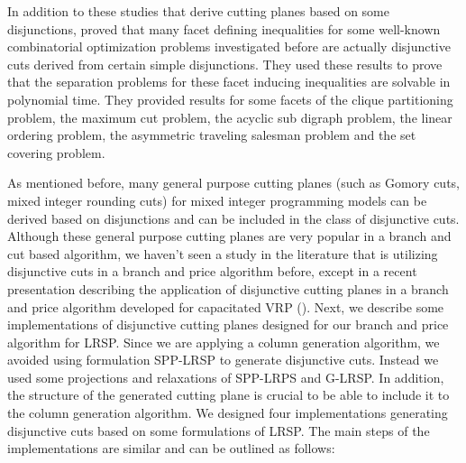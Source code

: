 In addition to these studies that derive cutting planes based on some disjunctions,
\citet{Letchford01} proved that  many facet defining inequalities for some well-known
combinatorial optimization problems investigated before are actually disjunctive cuts
derived from certain simple disjunctions.
They used these results to prove that the separation
problems for these facet inducing inequalities are solvable in polynomial time. They provided
results for some facets of the clique partitioning problem, the maximum cut problem,
the acyclic sub digraph problem, the linear ordering problem, the asymmetric traveling
salesman problem and the set covering problem.

As mentioned before, many general purpose cutting planes (such as Gomory cuts, mixed
integer rounding cuts) for mixed integer programming models can be  derived based on
disjunctions and can be included in the class of disjunctive cuts. Although
these general purpose cutting planes are very popular in a branch and cut based
algorithm, we haven't seen a study in the literature that is utilizing disjunctive cuts
in a branch and price algorithm before, except in a recent
presentation describing the application of disjunctive cutting planes in a branch and price
algorithm developed for capacitated VRP (\citet{Ropke08}). Next, we describe some
implementations of disjunctive cutting planes designed for our branch and price algorithm
for LRSP. Since we are applying a column generation algorithm, we avoided
using formulation SPP-LRSP to generate disjunctive cuts. Instead we used some projections
and relaxations of SPP-LRPS and G-LRSP. In addition,  the structure of the generated
cutting plane is crucial to be able to include it to the column generation algorithm.
We designed four implementations generating disjunctive cuts based on some formulations
of LRSP. The main steps of the implementations  are similar and can be outlined as follows:

